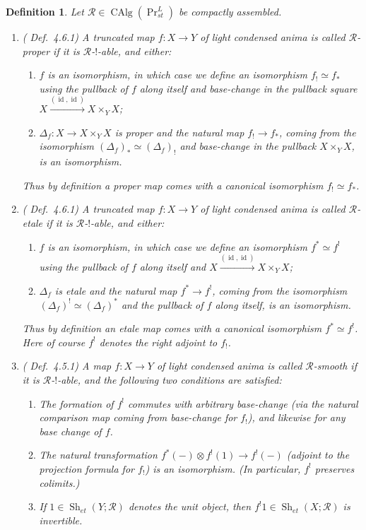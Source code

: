 \documentclass[12pt]{article}
\newtheorem{definition}[theorem]{Definition}
\newcommand{\on}{\operatorname}
\begin{document}
\begin{definition}\label{etalepropersmoothdef}
Let $\mathcal{R}\in\on{CAlg}(\on{Pr}^L_{st})$ be compactly assembled.
\begin{enumerate}
\item (\cite{HeyerSixFunctors} Def.\ 4.6.1) A truncated map $f:X\to Y$ of light condensed anima is called \emph{$\mathcal{R}$-proper} if it is $\mathcal{R}$-$!$-able, and either:
\begin{enumerate}
\item $f$ is an isomorphism, in which case we define an isomorphism $f_!\simeq f_\ast$ using the pullback of $f$ along itself and base-change in the pullback square $X\overset{(\on{id},\on{id})}{\longrightarrow} X\times_Y X$;
\item $\Delta_f:X\to X\times_Y X$ is proper and the natural map $f_!\to f_\ast$, coming from the isomorphism $(\Delta_f)_\ast\simeq (\Delta_f)_!$ and base-change in the pullback $X\times_Y X$, is an isomorphism.
\end{enumerate}
Thus by definition a proper map comes with a canonical isomorphism $f_!\simeq f_\ast$.
\item (\cite{HeyerSixFunctors} Def.\ 4.6.1) A truncated map $f:X\to Y$ of light condensed anima is called \emph{$\mathcal{R}$-etale} if it is $\mathcal{R}$-$!$-able, and either:
\begin{enumerate}
\item $f$ is an isomorphism, in which case we define an isomorphism $f^\ast \simeq f^!$ using the pullback of $f$ along itself and $X\overset{(\on{id},\on{id})}{\longrightarrow} X\times_Y X$;
\item $\Delta_f$ is etale and the natural map $f^\ast \to f^!$, coming from the isomorphism $(\Delta_f)^!\simeq (\Delta_f)^\ast$ and the pullback of $f$ along itself, is an isomorphism.
\end{enumerate}
Thus by definition an etale map comes with a canonical isomorphism $f^\ast\simeq f^!$.  Here of course $f^!$ denotes the right adjoint to $f_!$.
\item (\cite{HeyerSixFunctors} Def.\ 4.5.1) A map $f:X\to Y$ of light condensed anima is called \emph{$\mathcal{R}$-smooth} if it is $\mathcal{R}$-$!$-able, and the following two conditions are satisfied:
\begin{enumerate}
\item The formation of $f^!$ commutes with arbitrary base-change (via the natural comparison map coming from base-change for $f_!$), and likewise for any base change of $f$.
\item The natural transformation $f^\ast(-)\otimes f^!(1)\rightarrow f^!(-)$ (adjoint to the projection formula for $f_!$) is an isomorphism.  (In particular, $f^!$ preserves colimits.)
\item If $1 \in \on{Sh}_{et}(Y;\mathcal{R})$ denotes the unit object, then $f^!1 \in \on{Sh}_{et}(X;\mathcal{R})$ is invertible.
\end{enumerate}
\end{enumerate}
\end{definition}
\end{document}
